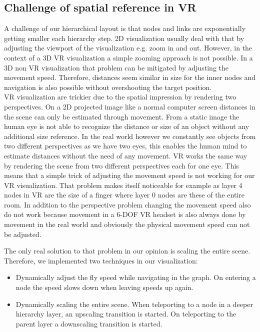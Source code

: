 \subsection{Challenge of spatial reference in VR}

A challenge of our hierarchical layout is that nodes and links are exponentially getting smaller each hierarchy step. 
2D visualization usually deal with that by adjusting the viewport of the visualization e.g. zoom in and out. 
However, in the context of a 3D VR visualization a simple zooming approach is not possible. 
In a 3D non VR visualization that problem can be mitigated by adjusting the movement speed. Therefore, distances seem similar in size for the inner nodes and navigation is also possible without overshooting the target position.\\ 
VR visualization are trickier due to the spatial impression by rendering two perspectives. On a 2D projected image like a normal computer screen distances in the scene can only be estimated through movement. From a static image the human eye is not able to recognize the distance or size of an object without any additional size reference. 
In the real world however we constantly see objects from two different perspectives as we have two eyes, this enables the human mind to estimate distances without the need of any movement. VR works the same way by rendering the scene from two different perspectives each for one eye.  
This means that a simple trick of adjusting the movement speed is not working for our VR visualization. 
That problem makes itself noticeable for example as layer 4 nodes in VR are the size of a finger where layer 0 nodes are these of the entire room.
In addition to the perspective problem changing the movement speed also do not work because movement in a 6-DOF VR headset is also always done by movement in the real world and obviously the physical movement speed can not be adjusted.

The only real solution to that problem in our opinion is scaling the entire scene. Therefore, we implemented two techniques in our visualization:
\begin{itemize}
    \item Dynamically adjust the fly speed while navigating in the graph. On entering a node the speed slows down when leaving speeds up again. 
    \item Dynamically scaling the entire scene. When teleporting to a node in a deeper hierarchy layer, an upscaling transition is started. On teleporting to the parent layer a downscaling transition is started. 
\end{itemize} 

